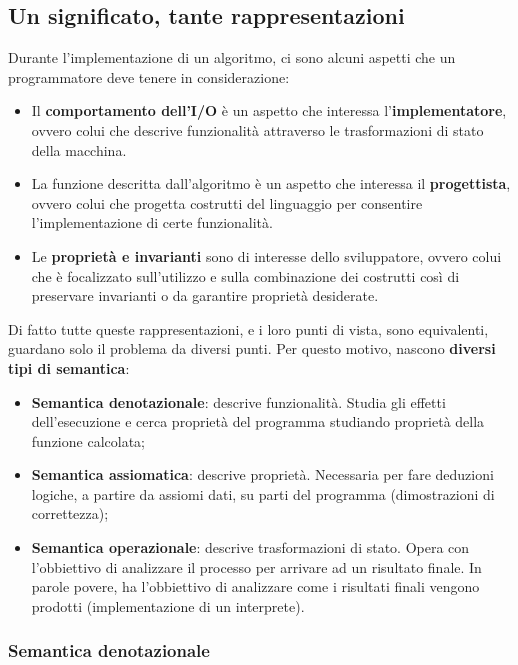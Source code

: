 \documentclass[a4paper]{article}
\begin{document}
	\subsection{Un significato, tante rappresentazioni}
	
	Durante l'implementazione di un algoritmo, ci sono alcuni aspetti che un programmatore deve tenere in considerazione:
	\begin{itemize}
		\item Il \textbf{comportamento dell'I/O} è un aspetto che interessa l'\textbf{implementatore}, ovvero colui che descrive funzionalità attraverso le trasformazioni di stato della macchina.
	
		\item La funzione descritta dall'algoritmo è un aspetto che interessa il \textbf{progettista}, ovvero colui che progetta costrutti del linguaggio per consentire l'implementazione di certe funzionalità.
	
		\item Le \textbf{proprietà e invarianti} sono di interesse dello sviluppatore, ovvero colui che è focalizzato sull'utilizzo e sulla combinazione dei costrutti così di preservare invarianti o da garantire proprietà desiderate.
	\end{itemize}
	Di fatto tutte queste rappresentazioni, e i loro punti di vista, sono equivalenti, guardano solo il problema da diversi punti. Per questo motivo, nascono \textbf{diversi tipi di semantica}:
	\begin{itemize}
		\item \textbf{Semantica denotazionale}: descrive funzionalità. Studia gli effetti dell'esecuzione e cerca proprietà del programma studiando proprietà della funzione calcolata;
		
		\item \textbf{Semantica assiomatica}: descrive proprietà. Necessaria per fare deduzioni logiche, a partire da assiomi dati, su parti del programma (dimostrazioni di correttezza);
		
		\item \textbf{Semantica operazionale}: descrive trasformazioni di stato. Opera con l'obbiettivo di analizzare il processo per arrivare ad un risultato finale. In parole povere, ha l'obbiettivo di analizzare come i risultati finali vengono prodotti (implementazione di un interprete).
	\end{itemize}\newpage

	\subsubsection{Semantica denotazionale}
	
\end{document}
